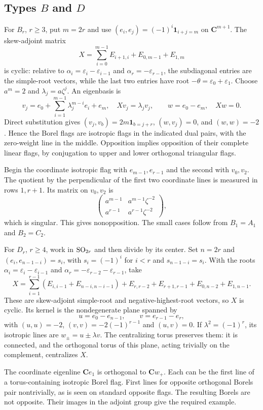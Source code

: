 \documentclass[11pt]{article}
\newcommand{\C}{\mathbf C}\newcommand{\Z}{\mathbf Z}\newcommand{\Q}{\mathbf Q}
\theoremstyle{definition}\newtheorem{definition}[theorem]{Definition}
\theoremstyle{remark}\newtheorem{remark}[theorem]{Remark}
\begin{document}
\subsection{Types \texorpdfstring{$B$ and $D$}{B and D}}
For $B_r$, $r\geq3$, put $m=2r$ and use $(e_i,e_j)=(-1)^i\mathbf1_{i+j=m}$ on $\C^{m+1}$. The skew-adjoint matrix
\[
 X=\sum_{i=0}^{m-1}E_{i+1,i}+E_{0,m-1}+E_{1,m}
\]
is cyclic: relative to $\alpha_i=\varepsilon_i-\varepsilon_{i-1}$ and $\alpha_r=-\varepsilon_{r-1}$, the subdiagonal entries are the simple-root vectors, while the last two entries have root $-\theta=\varepsilon_0+\varepsilon_1$. Choose $a^m=2$ and $\lambda_j=a\zeta^j$. An eigenbasis is
\[
 v_j=e_0+\sum_{i=1}^{m-1}\lambda_j^{m-i}e_i+e_m,
 \quad Xv_j=\lambda_jv_j,
 \qquad w=e_0-e_m,\quad Xw=0.
\]
Direct substitution gives $(v_j,v_b)=2m\mathbf1_{b=j+r}$, $(w,v_j)=0$, and $(w,w)=-2$. Hence the Borel flags are isotropic flags in the indicated dual pairs, with the zero-weight line in the middle. Opposition implies opposition of their complete linear flags, by conjugation to upper and lower orthogonal triangular flags.

Begin the coordinate isotropic flag with $e_{m-1},e_{r-1}$ and the second with $v_0,v_2$. The quotient by the perpendicular of the first two coordinate lines is measured in rows $1,r+1$. Its matrix on $v_0,v_2$ is
\[
 \begin{pmatrix}a^{m-1}&a^{m-1}\zeta^{-2}\\
 a^{r-1}&a^{r-1}\zeta^{-2}\end{pmatrix},
\]
which is singular. This gives nonopposition. The small cases follow from $B_1=A_1$ and $B_2=C_2$.

For $D_r$, $r\geq4$, work in $\operatorname{SO}_{2r}$ and then divide by its center. Set $n=2r$ and $(e_i,e_{n-1-i})=s_i$, with $s_i=(-1)^i$ for $i<r$ and $s_{n-1-i}=s_i$. With the roots $\alpha_i=\varepsilon_i-\varepsilon_{i-1}$ and $\alpha_r=-\varepsilon_{r-2}-\varepsilon_{r-1}$, take
\[
 X=\sum_{i=1}^{r-1}(E_{i,i-1}+E_{n-i,n-i-1})
       +E_{r,r-2}+E_{r+1,r-1}+E_{0,n-2}+E_{1,n-1}.
\]
These are skew-adjoint simple-root and negative-highest-root vectors, so $X$ is cyclic. Its kernel is the nondegenerate plane spanned by
\[
 u=e_0-e_{n-1},\qquad v=e_{r-1}-e_r,
\]
with $(u,u)=-2$, $(v,v)=-2(-1)^{r-1}$ and $(u,v)=0$. If $\lambda^2=(-1)^r$, its isotropic lines are $w_\pm=u\pm\lambda v$. The centralizing torus preserves them: it is connected, and the orthogonal torus of this plane, acting trivially on the complement, centralizes $X$.

The coordinate eigenline $\C e_1$ is orthogonal to $\C w_+$. Each can be the first line of a torus-containing isotropic Borel flag. First lines for opposite orthogonal Borels pair nontrivially, as is seen on standard opposite flags. The resulting Borels are not opposite. Their images in the adjoint group give the required example.
\end{document}
